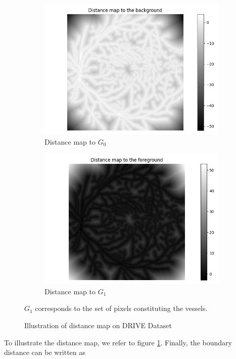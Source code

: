 \documentclass[onecolumn]{article}
\begin{document}
\begin{figure}[h!]
\begin{subfigure}{0.44\textwidth}
         \includegraphics[width=\textwidth]{figures/ex_dist3.png}
         \caption{Distance map to $G_0$}
     \end{subfigure}
     \hfill
     \begin{subfigure}{0.44\textwidth}
     \centering
         \includegraphics[width=\textwidth]{figures/ex_dist4.png}
         \caption{Distance map to $G_1$}
     \end{subfigure}
     \caption{Illustration of distance map on DRIVE Dataset} $G_1$ corresponds to the set of pixels constituting the vessels.
     \label{fig:dist_map_DRIVE}
 \end{figure}
To illustrate the distance map, we refer to figure \ref{fig:dist_map_DRIVE}. Finally, the boundary distance can be written as 
\end{document}
